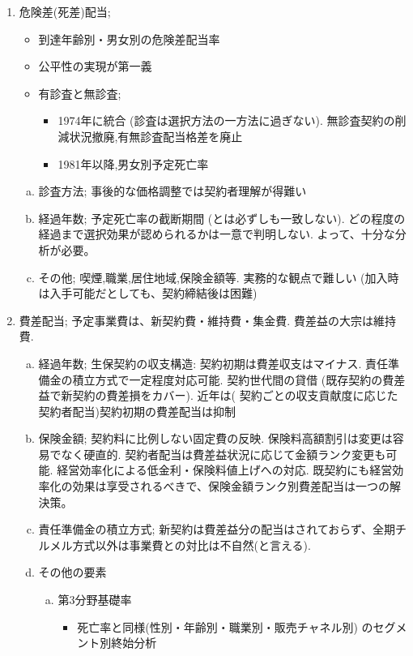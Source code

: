 \documentclass[report,gutter=10mm,fore-edge=10mm,uplatex,dvipdfmx]{jlreq}
\begin{document}
\begin{enumerate} [(1)]
\begin{enumerate} [(a)]
\end{enumerate}
 \item 危険差(死差)配当; 
\begin{itemize}
 \item 到達年齢別・男女別の危険差配当率
 \item 公平性の実現が第一義
 \item   有診査と無診査; 
\begin{itemize}
 \item 1974年に統合 (診査は選択方法の一方法に過ぎない). 無診査契約の削減状況撤廃,有無診査配当格差を廃止
 \item 1981年以降,男女別予定死亡率
\end{itemize}
\end{itemize}
\begin{enumerate} [(a)]
 \item 診査方法; 事後的な価格調整では契約者理解が得難い
 \item 経過年数; 予定死亡率の截断期間 (とは必ずしも一致しない).   どの程度の経過まで選択効果が認められるかは一意で判明しない.   よって、十分な分析が必要。
 \item その他; 喫煙,職業,居住地域,保険金額等. 実務的な観点で難しい (加入時は入手可能だとしても、契約締結後は困難)
\end{enumerate}
 \item 費差配当; 予定事業費は、新契約費・維持費・集金費.  費差益の大宗は維持費.  
\begin{enumerate}[(a)]
 \item 経過年数;   生保契約の収支構造: 契約初期は費差収支はマイナス. 責任準備金の積立方式で一定程度対応可能. 契約世代間の貸借 (既存契約の費差益で新契約の費差損をカバー). 近年は( 契約ごとの収支貢献度に応じた契約者配当)契約初期の費差配当は抑制
 \item 保険金額; 契約料に比例しない固定費の反映. 保険料高額割引は変更は容易でなく硬直的. 契約者配当は費差益状況に応じて金額ランク変更も可能.   
経営効率化による低金利・保険料値上げへの対応.  
既契約にも経営効率化の効果は享受されるべきで、保険金額ランク別費差配当は一つの解決策。
 \item 責任準備金の積立方式; 新契約は費差益分の配当はされておらず、全期チルメル方式以外は事業費との対比は不自然(と言える).  
 \item その他の要素
\begin{enumerate} [(a)]
 \item 第3分野基礎率
\begin{itemize}
 \item 死亡率と同様(性別・年齢別・職業別・販売チャネル別) のセグメント別終始分析

\end{itemize}
\end{enumerate}
\end{enumerate}
\end{enumerate}
\end{document}
